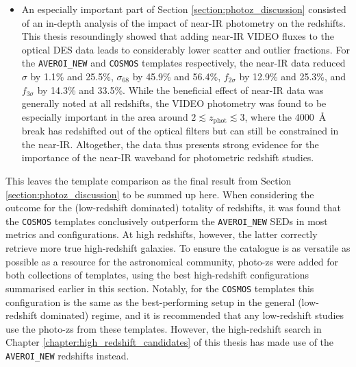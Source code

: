 \begin{itemize}
    \item An especially important part of Section \ref{section:photoz_discussion} consisted of an in-depth analysis of the impact of near-IR photometry on the \DESVIDEO redshifts. This thesis resoundingly showed that adding near-IR VIDEO fluxes to the optical DES data leads to considerably lower scatter and outlier fractions. For the \texttt{AVEROI\_NEW} and \texttt{COSMOS} templates respectively, the near-IR data reduced $\sigma$ by 1.1\% and 25.5\%, $\sigma_{68}$ by 45.9\% and 56.4\%, $f_{2\sigma}$ by 12.9\% and 25.3\%, and $f_{3\sigma}$ by 14.3\% and 33.5\%.  While the beneficial effect of near-IR data was generally noted at all redshifts, the VIDEO photometry was found to be especially important in the area around $ 2 \lesssim z_{\mathrm{phot}} \lesssim 3$, where the \SI{4000}{\angstrom} break has redshifted out of the optical filters but can still be constrained in the near-IR. Altogether, the data thus presents strong evidence for the importance of the near-IR waveband for photometric redshift studies. 
    

\end{itemize}

 
This leaves the template comparison as the final result from Section \ref{section:photoz_discussion} to be summed up here. When considering the outcome for the (low-redshift dominated) totality of redshifts, it was found that the \texttt{COSMOS} templates conclusively outperform the \texttt{AVEROI\_NEW} SEDs in most metrics and configurations. At high redshifts, however, the latter correctly retrieve more true high-redshift galaxies. To ensure the \DESVIDEO catalogue is as versatile as possible as a resource for the astronomical community, photo-zs were added for both collections of templates, using the best high-redshift configurations summarised earlier in this section. Notably, for the \texttt{COSMOS} templates this configuration is the same as the best-performing setup in the general (low-redshift dominated) regime, and it is recommended that any low-redshift studies use the photo-zs from these templates. However, the high-redshift search in Chapter \ref{chapter:high_redshift_candidates} of this thesis has made use of the \texttt{AVEROI\_NEW} redshifts instead. \par

